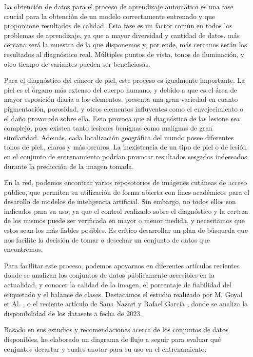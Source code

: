 La obtención de datos para el proceso de aprendizaje automático es una fase crucial para la obtención de un modelo correctamente entrenado y que proporcione resultados de calidad. Esta fase es un factor común en todos los problemas de aprendizaje, ya que a mayor diversidad y cantidad de datos, más cercana será la muestra de la que disponemos y, por ende, más cercanos serán los resultados al diagnóstico real. Múltiples puntos de vista, tonos de iluminación, y otro tiempo de variantes pueden ser  beneficiosas.

Para el diagnóstico del cáncer de piel, este proceso es igualmente importante. La piel es el órgano más extenso del cuerpo humano, y debido a que es el área de mayor esposición diaria a los elementos, presenta una gran variedad en cuanto pigmentación, porosidad, y otros elementos influyentes como el envejecimiento o el daño provocado sobre ella. Esto provoca que el diagnóstico de las lesione sea complejo, pues existen tanto lesiones benignas como malignas de gran similaridad. Además, cada localización geográfica del mundo posee diferentes tonos de piel., claros y más oscuros. La inexistencia de un tipo de piel o de lesión en el conjunto de entrenamiento podrían provocar resultados sesgados indeseados durante la predicción de la imagen tomada.

En la red, podemos encontrar varios reposotorios de imágenes cutáneas de acceso público,  que permiten su utilización de forma abierta con fines académicos para el desarollo de modelos de inteligencia artificial. Sin embargo, no todos ellos son indicados para su uso, ya que el control realizado sobre el diagnóstico y la certeza de los mismos puede ser verificada en mayor o menor medida, y necesitamos que estos sean los más fiables posibles. Es crítico desarrollar un plan de búsqueda que nos facilite la decisión de tomar o desechar un conjunto de datos que encontremos.

Para facilitar este proceso, podemos apoyarnos en diferentes artículos recientes donde se analizan los conjuntos de datos públicamente accesibles en la actualidad, y conocer la calidad de la imagen, el porcentaje de fiabilidad del etiquetado y el balance de clases. Destacamos el estudio realizado por M. Goyal et Al.  \cite{goyal2020artificial}, o el reciente artículo de  Sana Nazari y Rafael García \cite{life13112123}, donde se analiza la disponibilidad de los datasets a fecha de 2023.

Basado en sus estudios y recomendaciones acerca de los conjuntos de datos disponibles, he elaborado un diagrama de flujo a seguir para evaluar qué conjuntos decartar y cuales anotar para su uso en el entrenamiento:

